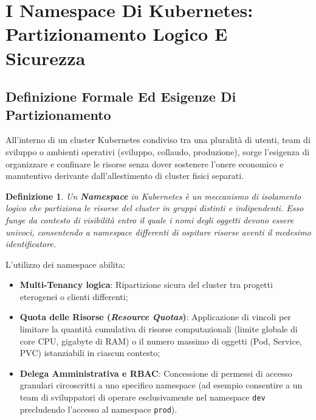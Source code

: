 \documentclass[11pt, a4paper]{article}
\newtheorem{theorem}{Definizione}
\begin{document}
\newpage


\section{I Namespace Di Kubernetes: Partizionamento Logico E Sicurezza}

\subsection{Definizione Formale Ed Esigenze Di Partizionamento}
All'interno di un cluster Kubernetes condiviso tra una pluralità di utenti, team di sviluppo o ambienti operativi (sviluppo, collaudo, produzione), sorge l'esigenza di organizzare e confinare le risorse senza dover sostenere l'onere economico e manutentivo derivante dall'allestimento di cluster fisici separati.

\begin{theorem}
Un \textbf{Namespace} in Kubernetes è un meccanismo di isolamento logico che partiziona le risorse del cluster in gruppi distinti e indipendenti. Esso funge da contesto di visibilità entro il quale i nomi degli oggetti devono essere univoci, consentendo a namespace differenti di ospitare risorse aventi il medesimo identificatore.
\end{theorem}

L'utilizzo dei namespace abilita:
\begin{itemize}[noitemsep]
    \item \textbf{Multi-Tenancy logica}: Ripartizione sicura del cluster tra progetti eterogenei o clienti differenti;
    \item \textbf{Quota delle Risorse (\emph{Resource Quotas})}: Applicazione di vincoli per limitare la quantità cumulativa di risorse computazionali (limite globale di core CPU, gigabyte di RAM) o il numero massimo di oggetti (Pod, Service, PVC) istanziabili in ciascun contesto;
    \item \textbf{Delega Amministrativa e RBAC}: Concessione di permessi di accesso granulari circoscritti a uno specifico namespace (ad esempio consentire a un team di sviluppatori di operare esclusivamente nel namespace \texttt{dev} precludendo l'accesso al namespace \texttt{prod}).
\end{itemize}
\end{document}
